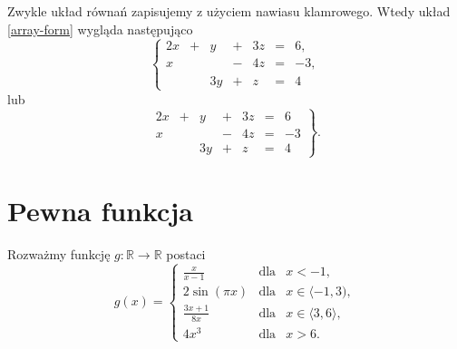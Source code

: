 \documentclass[12 pt, leqno]{article}
\begin{document}
Zwykle układ równań zapisujemy z użyciem nawiasu klamrowego. Wtedy układ \eqref{array-form} wygląda następująco
\begin{equation*}
\left\{
\begin{array}{rrrrrrr}
2x & + & y & + & 3z & = & 6 , \\
x &  &  & - & 4z & = & -3 , \\
 &  & 3y & + & z & = & 4 
\end{array}
\right.
\end{equation*}
lub
\begin{equation*}
\left.
\begin{array}{rrrrrrr}
2x & + & y & + & 3z & = & 6 \\
x &  &  & - & 4z & = & -3  \\
 &  & 3y & + & z & = & 4 
\end{array}
\right\}.
\end{equation*}

\section{Pewna funkcja}
Rozważmy funkcję $g:\mathbb{R}\rightarrow\mathbb{R}$ postaci
\begin{equation*}
    g(x)=\left\{
    \begin{array}{ccc}
        \frac{x}{x-1} & \mbox{dla} & x < -1,  \\
        2\sin\!{(\pi x)} & \mbox{dla} &  x \in \langle -1,3), \\
        \frac{3x+1}{8x} & \mbox{dla} & x \in \langle 3,6 \rangle,  \\
        4x^3 & \mbox{dla} & x > 6.
    \end{array}
    \right.
\end{equation*}
\end{document}
